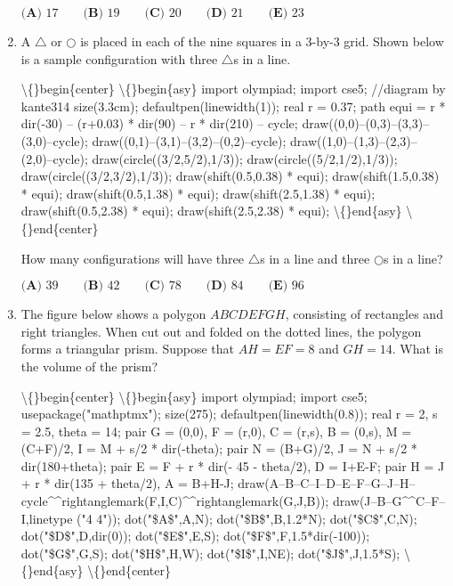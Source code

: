 \documentclass{article}
\begin{document}
\begin{enumerate}[label=\arabic*., itemsep=0.5em]
\(\textbf{(A) } 17 \qquad \textbf{(B) } 19 \qquad \textbf{(C) } 20 \qquad \textbf{(D) } 21 \qquad \textbf{(E) } 23\)\par \vspace{0.5em}\item A \(\triangle\) or \(\bigcirc\) is placed in each of the nine squares in a \(3\)-by-\(3\) grid. Shown below is a sample configuration with three \(\triangle\)s in a line.

\textbackslash\{\}begin\{center\}
\textbackslash\{\}begin\{asy\}
import olympiad;
import cse5;
//diagram by kante314
size(3.3cm);
defaultpen(linewidth(1));
real r = 0.37;
path equi = r * dir(-30) -- (r+0.03) * dir(90) -- r * dir(210) -- cycle;
draw((0,0)--(0,3)--(3,3)--(3,0)--cycle);
draw((0,1)--(3,1)--(3,2)--(0,2)--cycle);
draw((1,0)--(1,3)--(2,3)--(2,0)--cycle);
draw(circle((3/2,5/2),1/3));
draw(circle((5/2,1/2),1/3));
draw(circle((3/2,3/2),1/3));
draw(shift(0.5,0.38) * equi);
draw(shift(1.5,0.38) * equi);
draw(shift(0.5,1.38) * equi);
draw(shift(2.5,1.38) * equi);
draw(shift(0.5,2.38) * equi);
draw(shift(2.5,2.38) * equi);
\textbackslash\{\}end\{asy\}
\textbackslash\{\}end\{center\}

How many configurations will have three \(\triangle\)s in a line and three \(\bigcirc\)s in a line?

\(\textbf{(A) } 39 \qquad \textbf{(B) } 42 \qquad \textbf{(C) } 78 \qquad \textbf{(D) } 84 \qquad \textbf{(E) } 96\)\par \vspace{0.5em}\item The figure below shows a polygon \(ABCDEFGH\), consisting of rectangles and right triangles. When cut out and folded on the dotted lines, the polygon forms a triangular prism. Suppose that \(AH = EF = 8\) and \(GH = 14\). What is the volume of the prism?


\textbackslash\{\}begin\{center\}
\textbackslash\{\}begin\{asy\}
import olympiad;
import cse5;
usepackage("mathptmx");
size(275);
defaultpen(linewidth(0.8));
real r = 2, s = 2.5, theta = 14;
pair G = (0,0), F = (r,0), C = (r,s), B = (0,s), M = (C+F)/2, I = M + s/2 * dir(-theta);
pair N = (B+G)/2, J = N + s/2 * dir(180+theta);
pair E = F + r * dir(- 45 - theta/2), D = I+E-F;
pair H = J + r * dir(135 + theta/2), A = B+H-J;
draw(A--B--C--I--D--E--F--G--J--H--cycle\^{}\^{}rightanglemark(F,I,C)\^{}\^{}rightanglemark(G,J,B));
draw(J--B--G\^{}\^{}C--F--I,linetype ("4 4"));
dot("\$A\$",A,N);
dot("\$B\$",B,1.2*N);
dot("\$C\$",C,N);
dot("\$D\$",D,dir(0));
dot("\$E\$",E,S);
dot("\$F\$",F,1.5*dir(-100));
dot("\$G\$",G,S);
dot("\$H\$",H,W);
dot("\$I\$",I,NE);
dot("\$J\$",J,1.5*S);
\textbackslash\{\}end\{asy\}
\textbackslash\{\}end\{center\}



\end{enumerate}
\end{document}
